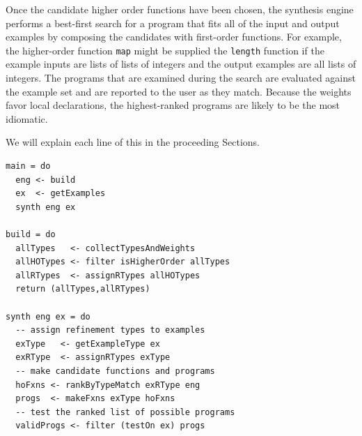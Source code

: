 Once the candidate higher order functions have been chosen, the synthesis engine performs a best-first search for a program that fits all of the input and output examples by composing the candidates with first-order functions. For example, the higher-order function \texttt{map} might be supplied the \texttt{length} function if the example inputs are lists of lists of integers and the output examples are all lists of integers. The programs that are examined during the search are evaluated against the example set and are reported to the user as they match. Because the weights favor local declarations, the highest-ranked programs are likely to be the most idiomatic.

 We will explain each line of this in the proceeding Sections.
 
\begin{lstlisting}[caption=A pseudocode representation of the build and synthesis stages of the synthesis algorithm, label=listing:Algo]
main = do
  eng <- build
  ex  <- getExamples
  synth eng ex
  
build = do
  allTypes   <- collectTypesAndWeights
  allHOTypes <- filter isHigherOrder allTypes
  allRTypes  <- assignRTypes allHOTypes
  return (allTypes,allRTypes)
  
synth eng ex = do
  -- assign refinement types to examples
  exType   <- getExampleType ex
  exRType  <- assignRTypes exType
  -- make candidate functions and programs
  hoFxns <- rankByTypeMatch exRType eng
  progs  <- makeFxns exType hoFxns
  -- test the ranked list of possible programs
  validProgs <- filter (testOn ex) progs
\end{lstlisting}
